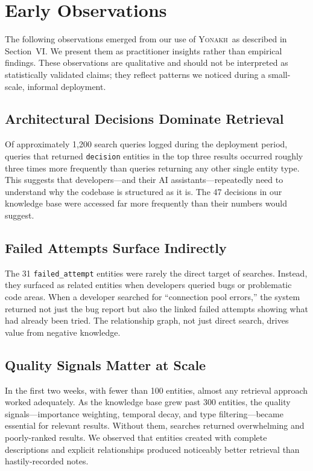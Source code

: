 \documentclass[10pt,journal,compsoc]{IEEEtran}
\newcommand{\yonakh}{\textsc{Yonakh}}
\begin{document}
\section{Early Observations}

The following observations emerged from our use of \yonakh\ as described in Section~VI. We present them as practitioner insights rather than empirical findings. These observations are qualitative and should not be interpreted as statistically validated claims; they reflect patterns we noticed during a small-scale, informal deployment.

\subsection{Architectural Decisions Dominate Retrieval}

Of approximately 1,200 search queries logged during the deployment period, queries that returned \texttt{decision} entities in the top three results occurred roughly three times more frequently than queries returning any other single entity type. This suggests that developers---and their AI assistants---repeatedly need to understand why the codebase is structured as it is. The 47 decisions in our knowledge base were accessed far more frequently than their numbers would suggest.

\subsection{Failed Attempts Surface Indirectly}

The 31 \texttt{failed\_attempt} entities were rarely the direct target of searches. Instead, they surfaced as related entities when developers queried bugs or problematic code areas. When a developer searched for ``connection pool errors,'' the system returned not just the bug report but also the linked failed attempts showing what had already been tried. The relationship graph, not just direct search, drives value from negative knowledge.

\subsection{Quality Signals Matter at Scale}

In the first two weeks, with fewer than 100 entities, almost any retrieval approach worked adequately. As the knowledge base grew past 300 entities, the quality signals---importance weighting, temporal decay, and type filtering---became essential for relevant results. Without them, searches returned overwhelming and poorly-ranked results. We observed that entities created with complete descriptions and explicit relationships produced noticeably better retrieval than hastily-recorded notes.
\end{document}

